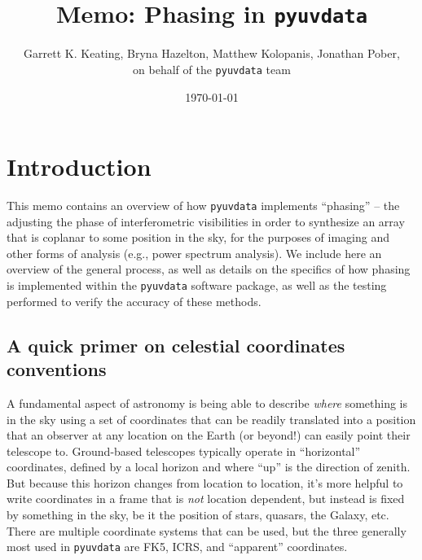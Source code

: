 \documentclass[11pt, oneside]{article}
\title{Memo: Phasing in \texttt{pyuvdata}}
\author{Garrett K. Keating, Bryna Hazelton, Matthew Kolopanis, Jonathan Pober, \\ on behalf of the \texttt{pyuvdata} team}
\date{\today}
\begin{document}
\maketitle

\section{Introduction}\label{sec:intro}
This memo contains an overview of how \texttt{pyuvdata} implements ``phasing'' -- the adjusting the phase of interferometric visibilities in order to synthesize an array that is coplanar to some position in the sky, for the purposes of imaging and other forms of analysis (e.g., power spectrum analysis). We include here an overview of the general process, as well as details on the specifics of how phasing is implemented within the \texttt{pyuvdata} software package, as well as the testing performed to verify the accuracy of these methods.


\subsection{A quick primer on celestial coordinates conventions}
A fundamental aspect of astronomy is being able to describe \emph{where} something is in the sky using a set of coordinates that can be readily translated into a position that an observer at any location on the Earth (or beyond!) can easily point their telescope to. Ground-based telescopes typically operate in ``horizontal'' coordinates, defined by a local horizon and where ``up'' is the direction of zenith. But because this horizon changes from location to location, it's more helpful to write coordinates in a frame that is \emph{not} location dependent, but instead is fixed by something in the sky, be it the position of stars, quasars, the Galaxy, etc. There are multiple coordinate systems that can be used, but the three generally most used in \texttt{pyuvdata} are FK5, ICRS, and ``apparent'' coordinates.
\end{document}
